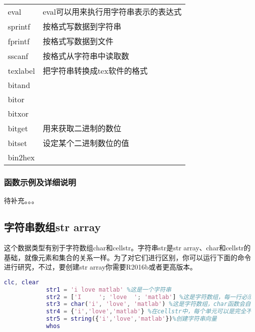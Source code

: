 \begin{longtable}{|l|l|}
            \hline
            eval&  eval可以用来执行用字符串表示的表达式\\
            sprintf& 按格式写数据到字符串\\
            fprintf& 按格式写数据到文件\\
            sscanf & 按格式从字符串中读取数\\
            texlabel & 把字符串转换成tex软件的格式\\
            bitand & {}\\
            bitor& {}\\
            bitxor&  {}\\
            bitget & 用来获取二进制的数位\\
            bitset & 设定某个二进制数位的值\\
            bin2hex &{}\\
            \hline
            \end{longtable}
        \subsubsection{函数示例及详细说明}
            \par
            待补充。。。
    \subsection{字符串数组str array}
        \par
        这个数据类型有别于字符数组char和cellstr。字符串str是str array、char和cellstr的基础，就像元素和集合的关系一样。为了对它们进行区别，你可以运行下面的命令进行研究，不过，要创建str array你需要R2016b或者更高版本。
                \begin{lstlisting}[language=Matlab]
            clc, clear
            str1 = 'i love matlab' %这是一个字符串
            str2 = ['I     '; 'love  '; 'matlab'] %这是字符数组，每一行必须具有相同的列数，不够以空格填补
            str3 = char('i', 'love', 'matlab') %这是字符数组，char函数会自动补充空格
            str4 = {'i','love','matlab'} %在cellstr中，每个单元可以是完全不同的内容，所以，不需要补充空格。
            str5 = string({'i','love','matlab'})%创建字符串向量
            whos
                \end{lstlisting}
